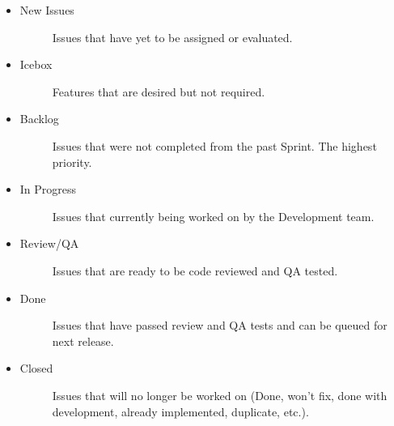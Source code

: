 \begin{itemize}
\item {} \begin{description}
\item[{New Issues}] \leavevmode
Issues that have yet to be assigned or evaluated.

\end{description}

\item {} \begin{description}
\item[{Icebox}] \leavevmode
Features that are desired but not required.

\end{description}

\item {} \begin{description}
\item[{Backlog}] \leavevmode
Issues that were not completed from the past Sprint. The highest priority.

\end{description}

\item {} \begin{description}
\item[{In Progress}] \leavevmode
Issues that currently being worked on by the Development team.

\end{description}

\item {} \begin{description}
\item[{Review/QA}] \leavevmode
Issues that are ready to be code reviewed and QA tested.

\end{description}

\item {} \begin{description}
\item[{Done}] \leavevmode
Issues that have passed review and QA tests and can be queued for next release.

\end{description}

\item {} \begin{description}
\item[{Closed}] \leavevmode
Issues that will no longer be worked on (Done, won’t fix, done with development, already implemented, duplicate, etc.).

\end{description}

\end{itemize}


